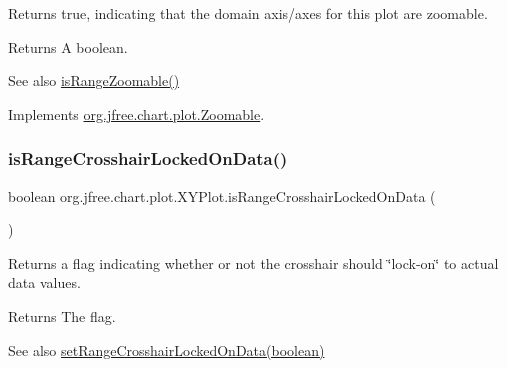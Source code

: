 Returns {\ttfamily true}, indicating that the domain axis/axes for this plot are zoomable.

\begin{DoxyReturn}{Returns}
A boolean.
\end{DoxyReturn}
\begin{DoxySeeAlso}{See also}
\mbox{\hyperlink{classorg_1_1jfree_1_1chart_1_1plot_1_1_x_y_plot_a730a3fdcafdb45f7d21112631dec8d28}{is\+Range\+Zoomable()}} 
\end{DoxySeeAlso}


Implements \mbox{\hyperlink{interfaceorg_1_1jfree_1_1chart_1_1plot_1_1_zoomable_a7c10a2f8573d8238ce31a4ee8d7dd2db}{org.\+jfree.\+chart.\+plot.\+Zoomable}}.

\mbox{\label{classorg_1_1jfree_1_1chart_1_1plot_1_1_x_y_plot_accbd1041d24c450ed59fe379584ae4b8}} 
\subsubsection{\texorpdfstring{is\+Range\+Crosshair\+Locked\+On\+Data()}{isRangeCrosshairLockedOnData()}}
{\footnotesize\ttfamily boolean org.\+jfree.\+chart.\+plot.\+X\+Y\+Plot.\+is\+Range\+Crosshair\+Locked\+On\+Data (\begin{DoxyParamCaption}{ }\end{DoxyParamCaption})}

Returns a flag indicating whether or not the crosshair should \char`\"{}lock-\/on\char`\"{} to actual data values.

\begin{DoxyReturn}{Returns}
The flag.
\end{DoxyReturn}
\begin{DoxySeeAlso}{See also}
\mbox{\hyperlink{classorg_1_1jfree_1_1chart_1_1plot_1_1_x_y_plot_a9597685c8e47dee16585b24a3bd46e70}{set\+Range\+Crosshair\+Locked\+On\+Data(boolean)}} 
\end{DoxySeeAlso}
\mbox{\label{classorg_1_1jfree_1_1chart_1_1plot_1_1_x_y_plot_a141d93dd4ffb2ed0a73aa37e745ed9ee}} 
